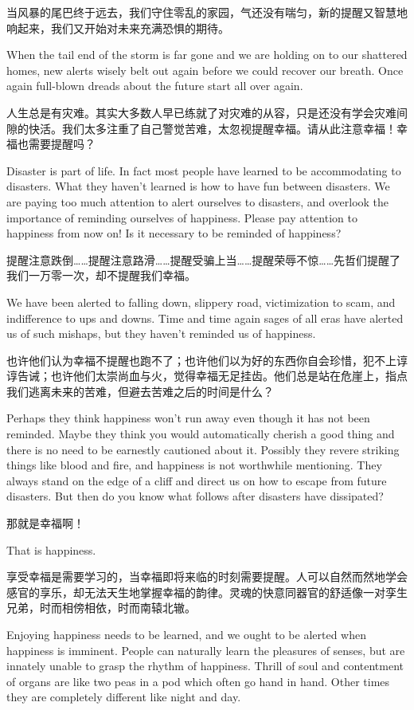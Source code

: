 {当风暴的尾巴终于远去，我们守住零乱的家园，气还没有喘匀，新的提醒又智慧地响起来，我们又开始对未来充满恐惧的期待。

When the tail end of the storm is far gone and we are holding on to our shattered homes, new alerts wisely belt out again before we could recover our breath. Once again full-blown dreads about the future start all over again.

人生总是有灾难。其实大多数人早已练就了对灾难的从容，只是还没有学会灾难间隙的快活。我们太多注重了自己警觉苦难，太忽视提醒幸福。请从此注意幸福！幸福也需要提醒吗？

Disaster is part of life. In fact most people have learned to be accommodating to disasters. What they haven't learned is how to have fun between disasters. We are paying too much attention to alert ourselves to disasters, and overlook the importance of reminding ourselves of happiness. Please pay attention to happiness from now on! Is it necessary to be reminded of happiness?

提醒注意跌倒……提醒注意路滑……提醒受骗上当……提醒荣辱不惊……先哲们提醒了我们一万零一次，却不提醒我们幸福。

We have been alerted to falling down, slippery road, victimization to scam, and indifference to ups and downs. Time and time again sages of all eras have alerted us of such mishaps, but they haven't reminded us of happiness.

也许他们认为幸福不提醒也跑不了；也许他们以为好的东西你自会珍惜，犯不上谆谆告诫；也许他们太崇尚血与火，觉得幸福无足挂齿。他们总是站在危崖上，指点我们逃离未来的苦难，但避去苦难之后的时间是什么？

Perhaps they think happiness won't run away even though it has not been reminded. Maybe they think you would automatically cherish a good thing and there is no need to be earnestly cautioned about it. Possibly they revere striking things like blood and fire, and happiness is not worthwhile mentioning. They always stand on the edge of a cliff and direct us on how to escape from future disasters. But then do you know what follows after disasters have dissipated?

那就是幸福啊！

That is happiness.

享受幸福是需要学习的，当幸福即将来临的时刻需要提醒。人可以自然而然地学会感官的享乐，却无法天生地掌握幸福的韵律。灵魂的快意同器官的舒适像一对孪生兄弟，时而相傍相依，时而南辕北辙。

Enjoying happiness needs to be learned, and we ought to be alerted when happiness is imminent. People can naturally learn the pleasures of senses, but are innately unable to grasp the rhythm of happiness. Thrill of soul and contentment of organs are like two peas in a pod which often go hand in hand. Other times they are completely different like night and day.

}
